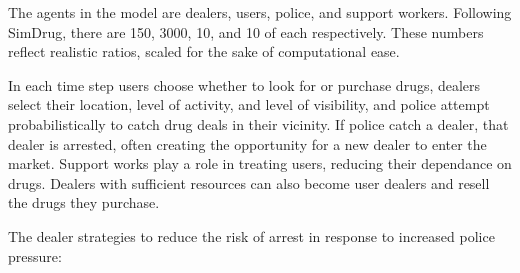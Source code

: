 \documentclass[runningheads,a4paper]{llncs}
\begin{document}
The agents in the model are dealers, users, police, and support workers. Following SimDrug, there are 150, 3000, 10, and 10 of each respectively. These numbers reflect realistic ratios, scaled for the sake of computational ease.

In each time step users choose whether to look for or purchase drugs, dealers select their location, level of activity, and level of visibility, and police attempt probabilistically to catch drug deals in their vicinity. If police catch a dealer, that dealer is arrested, often creating the opportunity for a new dealer to enter the market. Support works play a role in treating users, reducing their dependance on drugs. Dealers with sufficient resources can also become user dealers and resell the drugs they purchase.





%

The dealer strategies to reduce the risk of arrest in response to increased police pressure:
\end{document}
